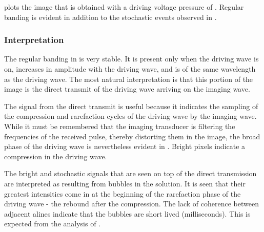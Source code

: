 



  plots the image that is obtained with a driving voltage pressure of \dbFifteen.
Regular banding is evident in addition to the stochastic events observed in .

\subsubsection{Interpretation}

The regular banding in  is very stable.
It is present only when the driving wave is on, increases in amplitude with the driving wave,
and is of the same wavelength as the driving wave.
The most natural interpretation is that this portion of the image is the 
direct transmit of the driving wave arriving on the imaging wave.

The signal from the direct transmit is useful because it indicates the sampling of the compression
and rarefaction cycles of the driving wave by the imaging wave.
While it must be remembered that the imaging transducer is filtering the frequencies of the received pulse,
thereby distorting them in the image, 
the broad phase of the driving wave is nevertheless evident in .
Bright pixels indicate a compression in the driving wave.

The bright and stochastic signals that are seen on top of the direct transmission 
are interpreted as resulting from bubbles in the solution.
It is seen that their greatest intensities come in at the beginning of the rarefaction phase of the driving wave - the rebound after the compression. 
The lack of coherence between adjacent alines indicate that the bubbles are short lived (milliseconds).
This is expected from the analysis of .

